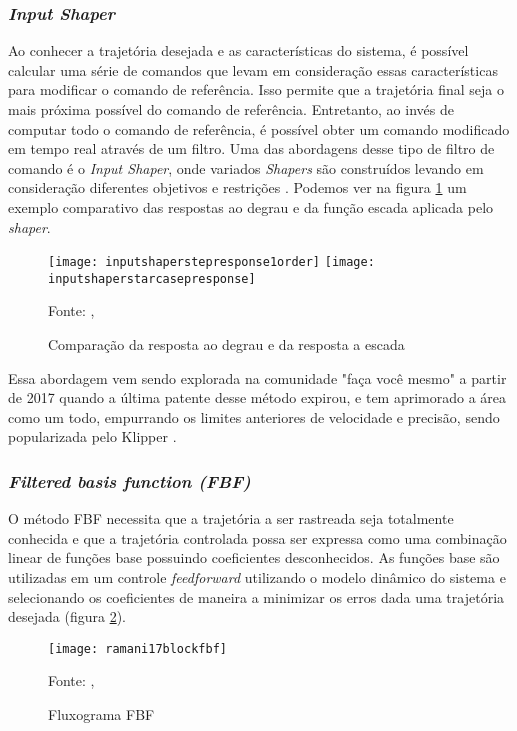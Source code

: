 \subsubsection{\textit{Input Shaper}}
Ao conhecer a trajetória desejada e as características do sistema, é possível calcular uma série de 
comandos que levam em consideração essas características para modificar o comando de referência. 
Isso permite que a trajetória final seja o mais próxima possível do comando de referência. 
Entretanto, ao invés de 
computar todo o comando de referência, é possível obter um 
comando modificado em tempo real através de um filtro. 
Uma das abordagens desse tipo de filtro de comando é o 
\textit{Input Shaper}, onde variados \textit{Shapers} são construídos levando 
em consideração diferentes objetivos e restrições 
\cite{singhose97}.
Podemos
ver na figura \ref{fig:degr_vs_esc} um exemplo comparativo
das respostas ao degrau e da função escada aplicada pelo \textit{shaper}.

\begin{figure}[!htb]
    \centering
    \caption{Comparação da resposta ao degrau e da resposta a escada}
    \texttt{[image: inputshaperstepresponse1order]}
    \texttt{[image: inputshaperstarcasepresponse]}

    {\footnotesize Fonte: \citeauthor{singhose97}, \citeyear{singhose97}}
    \label{fig:degr_vs_esc}
\end{figure}

Essa abordagem vem sendo explorada na comunidade "faça você mesmo" a partir de 2017 
quando a última patente desse método expirou, e tem aprimorado a área como
um todo, empurrando os limites anteriores de velocidade e precisão,
sendo popularizada pelo Klipper \cite{klipperkinematic}.

\subsubsection{\textit{Filtered basis function (FBF)}}
O método FBF necessita que a trajetória a ser rastreada seja totalmente
conhecida e que a trajetória controlada possa ser expressa como
uma combinação linear de funções base possuindo coeficientes desconhecidos.
As funções base são utilizadas em um controle \textit{feedforward} utilizando
o modelo dinâmico do sistema e selecionando os coeficientes de maneira a
minimizar os erros dada uma trajetória desejada (figura \ref{fig:flowchart_fbf}).
\cite{ramani17}

\begin{figure}[!htb]
    \centering
    \caption{Fluxograma FBF}
    \texttt{[image: ramani17blockfbf]}

    {\footnotesize Fonte: \citeauthor{ramani17}, \citeyear{ramani17}}
    \label{fig:flowchart_fbf}
\end{figure}

